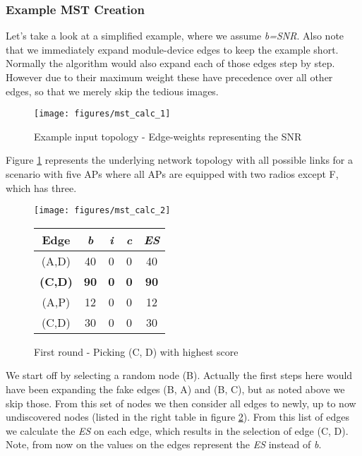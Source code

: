 \newpage
	
      \subsubsection{Example MST Creation}
	Let's take a look at a simplified example, where we assume \textit{b=SNR}. Also note that we immediately expand module-device edges to keep the example short.
	Normally the algorithm would also expand each of those edges step by step. However due to their maximum weight these have precedence over all other edges, 
	so that we merely skip the tedious images.
	\begin{figure}[h!]
	  \centering
	  \begin{minipage}{0.5\textwidth}
	    \texttt{[image: figures/mst\_calc\_1]}
	  \end{minipage}
	  \caption{Example input topology - Edge-weights representing the \ac{SNR}}
	  \label{fig:mst_calc_initial}
	\end{figure}
	
	Figure \ref{fig:mst_calc_initial} represents the underlying network topology with all possible links for a scenario with five APs where all APs are equipped with two
	radios except F, which has three.
	
	\begin{figure}[h!]
	  \centering
	  \begin{minipage}{7.4cm}
	    \texttt{[image: figures/mst\_calc\_2]}
	  \end{minipage}
	  \begin{minipage}{4cm}
	    \begin{tabular}{c||c|c|c||c}
	      Edge & \textit{b} & \textit{i} & \textit{c} & \textit{ES}\\ \hline\hline
	      (A,D) & 40 & 0 & 0 & 40 \\ \hline
	      \textbf{(C,D)} & \textbf{90} & \textbf{0} & \textbf{0} & \textbf{90} \\ \hline
	      (A,P) & 12 & 0 & 0 & 12 \\ \hline
	      (C,D) & 30 & 0 & 0 & 30 \\ \hline
	    \end{tabular}
	  \end{minipage}
	  \caption{First round - Picking (C, D) with highest score}
	  \label{fig:mst_calc_2}
	\end{figure}
	
\newpage
	
	We start off by selecting a random node (B). Actually the first steps here would have been expanding the fake edges (B, A) and (B, C), 
	but as noted above we skip those. From this set of nodes we then consider all edges to newly, 
	up to now undiscovered nodes (listed in the right table in figure \ref{fig:mst_calc_2}).
	From this list of edges we calculate the \textit{ES} on each edge, which results in the selection of edge (C, D). 
	Note, from now on the values on the edges represent the \textit{ES} instead of \textit{b}.
	

